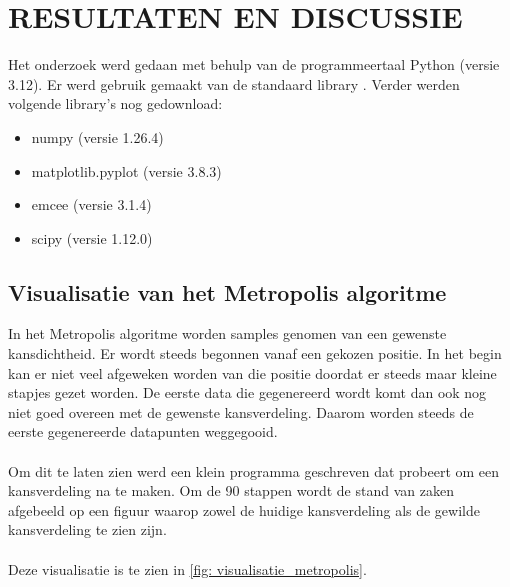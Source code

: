 \section{RESULTATEN EN DISCUSSIE}
Het onderzoek werd gedaan met behulp van de programmeertaal Python (versie 3.12). Er werd gebruik gemaakt van de standaard library \cite{unknown-author-no-date-python}. Verder werden volgende library's nog gedownload:
\begin{itemize}
    \item numpy (versie 1.26.4)
    \item matplotlib.pyplot (versie 3.8.3)
    \item emcee (versie 3.1.4)
    \item scipy (versie 1.12.0)
\end{itemize}
\subsection{Visualisatie van het Metropolis algoritme}
In het Metropolis algoritme worden samples genomen van een gewenste kansdichtheid. Er wordt steeds begonnen vanaf een gekozen positie. In het begin kan er niet veel afgeweken worden van die positie doordat er steeds maar kleine stapjes gezet worden. De eerste data die gegenereerd wordt komt dan ook nog niet goed overeen met de gewenste kansverdeling. Daarom worden steeds de eerste gegenereerde datapunten weggegooid. \\ \\
Om dit te laten zien werd een klein programma geschreven dat probeert om een kansverdeling na te maken. Om de 90 stappen wordt de stand van zaken afgebeeld op een figuur waarop zowel de huidige kansverdeling als de gewilde kansverdeling te zien zijn. \\ \\Deze visualisatie is te zien in \cref{fig: visualisatie_metropolis}.
